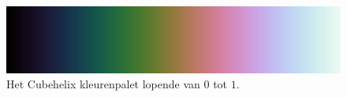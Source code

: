 \begin{figure}[t]
  \centering
  \includegraphics[width=\textwidth]{./img/raw/cubehelix-colours.png}
  \caption{Het Cubehelix kleurenpalet lopende van $0$ tot $1$.}
  \label{fig:da-cubehelix}
\end{figure}
